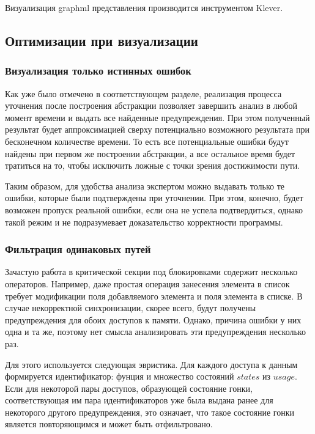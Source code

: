 Визуализация graphml представления производится инструментом Klever.

\subsection{Оптимизации при визуализации}

\subsubsection{Визуализация только истинных ошибок}

Как уже было отмечено в соответствующем разделе, реализация процесса уточнения после построения абстракции позволяет завершить анализ в любой момент времени и выдать все найденные предупреждения.
При этом полученный результат будет аппроксимацией сверху потенциально возможного результата при бесконечном количестве времени.
То есть все потенциальные ошибки будут найдены при первом же построении абстракции, а все остальное время будет тратиться на то, чтобы исключить ложные с точки зрения достижимости пути.

Таким образом, для удобства анализа экспертом можно выдавать только те ошибки, которые были подтверждены при уточнении.
При этом, конечно, будет возможен пропуск реальной ошибки, если она не успела подтвердиться, однако такой режим и не подразумевает доказательство корректности программы.

\subsubsection{Фильтрация одинаковых путей}

Зачастую работа в критической секции под блокировками содержит несколько операторов.
Например, даже простая операция занесения элемента в список требует модификации поля добавляемого элемента и поля элемента в списке.
В случае некорректной синхронизации, скорее всего, будут получены предупреждения для обоих доступов к памяти.
Однако, причина ошибки у них одна и та же, поэтому нет смысла анализировать эти предупреждения несколько раз.

Для этого используется следующая эвристика. Для каждого доступа к данным формируется идентификатор: фунция и множество состояний $states$ из $usage$.
Если для некоторой пары доступов, образующей состояние гонки, соответствующая им пара идентификаторов уже была выдана ранее для некоторого другого предупреждения, это означает, что такое состояние гонки является повторяющимся и может быть отфильтровано.


\clearpage